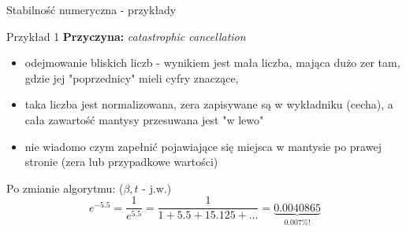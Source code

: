 \begin{frame}{Stabilność numeryczna - przykłady}

	\begin{exampleblock}{Przykład 1}
        {\bf Przyczyna:} {\it catastrophic cancellation}\\
        \begin{itemize}
            \item odejmowanie bliskich liczb - wynikiem jest mała liczba, mająca dużo zer tam, gdzie jej  "poprzednicy" mieli cyfry znaczące,
            \item taka liczba jest normalizowana, zera zapisywane są w wykładniku (cecha), a cała zawartość mantysy przesuwana jest "w lewo"
            \item nie wiadomo czym zapełnić pojawiające się miejsca w mantysie po prawej stronie (zera lub przypadkowe wartości)
        \end{itemize}
        Po zmianie algorytmu: ($\beta, t$ - j.w.)
        \\[-6pt]
        \[
            e^{-5.5} = \frac{1}{e^{5.5}} = \frac{1}{1 + 5.5 + 15.125 + ...} = \underbrace{0.0040865}_\text{0.007\%!}
        \]
        \\[-8pt]
    \end{exampleblock}
\end{frame}

